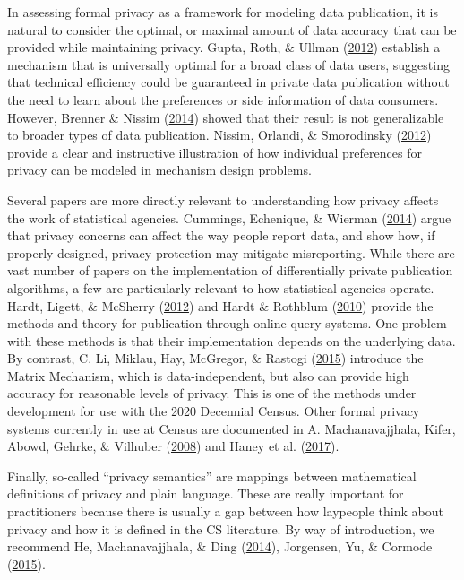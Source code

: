 \documentclass[]{article}
\begin{document}
In assessing formal privacy as a framework for modeling data
publication, it is natural to consider the optimal, or maximal amount of
data accuracy that can be provided while maintaining privacy. Gupta,
Roth, \& Ullman
(\protect\hyperlink{ref-Gupta:2012:ICP:2238936.2238961}{2012}) establish
a mechanism that is universally optimal for a broad class of data users,
suggesting that technical efficiency could be guaranteed in private data
publication without the need to learn about the preferences or side
information of data consumers. However, Brenner \& Nissim
(\protect\hyperlink{ref-BrennerNissim:Impossibility:SIAM:2014}{2014})
showed that their result is not generalizable to broader types of data
publication. Nissim, Orlandi, \& Smorodinsky
(\protect\hyperlink{ref-Nissim:2012:PMD:2229012.2229073}{2012}) provide
a clear and instructive illustration of how individual preferences for
privacy can be modeled in mechanism design problems.

Several papers are more directly relevant to understanding how privacy
affects the work of statistical agencies. Cummings, Echenique, \&
Wierman (\protect\hyperlink{ref-cummings:empirical:corr:2014}{2014})
argue that privacy concerns can affect the way people report data, and
show how, if properly designed, privacy protection may mitigate
misreporting. While there are vast number of papers on the
implementation of differentially private publication algorithms, a few
are particularly relevant to how statistical agencies operate. Hardt,
Ligett, \& McSherry
(\protect\hyperlink{ref-Hardt:Simple:NIPS:2012}{2012}) and Hardt \&
Rothblum (\protect\hyperlink{ref-Hardt:Multiplicative:FOCS10}{2010})
provide the methods and theory for publication through online query
systems. One problem with these methods is that their implementation
depends on the underlying data. By contrast, C. Li, Miklau, Hay,
McGregor, \& Rastogi (\protect\hyperlink{ref-li:matrix:VLDB:2015}{2015})
introduce the Matrix Mechanism, which is data-independent, but also can
provide high accuracy for reasonable levels of privacy. This is one of
the methods under development for use with the 2020 Decennial Census.
Other formal privacy systems currently in use at Census are documented
in A. Machanavajjhala, Kifer, Abowd, Gehrke, \& Vilhuber
(\protect\hyperlink{ref-Machanavajjhala:OTM:ICDE:2008}{2008}) and Haney
et al. (\protect\hyperlink{ref-HaneySIGMOD2017}{2017}).

Finally, so-called ``privacy semantics'' are mappings between
mathematical definitions of privacy and plain language. These are really
important for practitioners because there is usually a gap between how
laypeople think about privacy and how it is defined in the CS
literature. By way of introduction, we recommend He, Machanavajjhala, \&
Ding (\protect\hyperlink{ref-He:Blowfish:ACMSIGMOD:2014}{2014}),
Jorgensen, Yu, \& Cormode
(\protect\hyperlink{ref-jorgensen:personalized:ICDE:2015}{2015}).
\end{document}
